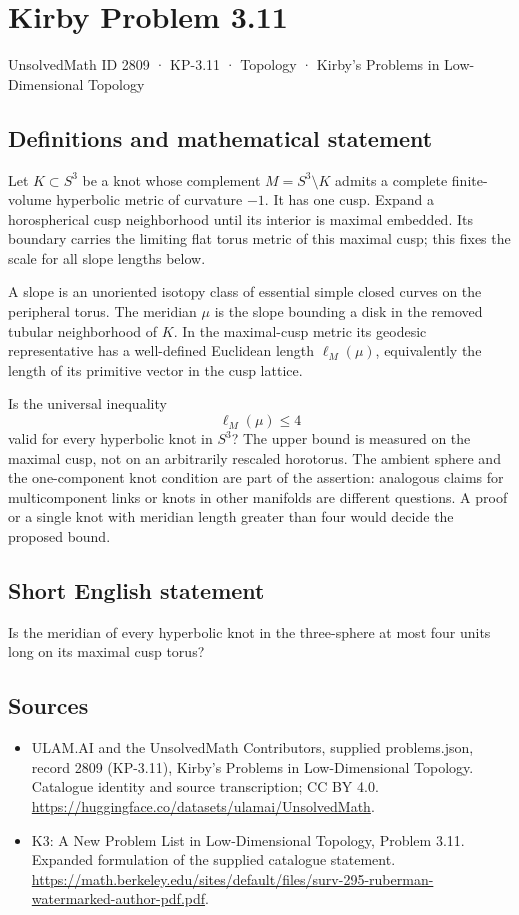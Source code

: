\documentclass[11pt,a4paper]{article}
\begin{document}
\section*{Kirby Problem 3.11}\label{2809}
{\small UnsolvedMath ID 2809 · KP-3.11 · Topology · Kirby's Problems in Low-Dimensional Topology}
\subsection{Definitions and mathematical statement}
Let $K\subset S^3$ be a knot whose complement $M=S^3\setminus K$ admits
a complete finite-volume hyperbolic metric of curvature $-1$. It has one cusp.
Expand a horospherical cusp neighborhood until its interior is maximal embedded.
Its boundary carries the limiting flat torus metric of this maximal cusp;
this fixes the scale for all slope lengths below.

A slope is an unoriented isotopy class of essential simple closed curves on
the peripheral torus. The meridian $\mu$ is the slope bounding a disk in the
removed tubular neighborhood of $K$. In the maximal-cusp metric its geodesic
representative has a well-defined Euclidean length $\ell_M(\mu)$, equivalently
the length of its primitive vector in the cusp lattice.

Is the universal inequality
\[
 \ell_M(\mu)\leq4
\]
valid for every hyperbolic knot in $S^3$? The upper bound is measured on the
maximal cusp, not on an arbitrarily rescaled horotorus. The ambient sphere
and the one-component knot condition are part of the assertion: analogous
claims for multicomponent links or knots in other manifolds are different
questions. A proof or a single knot with meridian length greater than four
would decide the proposed bound.
\subsection{Short English statement}
Is the meridian of every hyperbolic knot in the three-sphere at most four units long on its maximal cusp torus?
\subsection{Sources}
\begin{itemize}
\item[S1] ULAM.AI and the UnsolvedMath Contributors, supplied problems.json, record 2809 (KP-3.11), Kirby's Problems in Low-Dimensional Topology. Catalogue identity and source transcription; CC BY 4.0.
\url{https://huggingface.co/datasets/ulamai/UnsolvedMath}.
\item[S2] K3: A New Problem List in Low-Dimensional Topology, Problem 3.11. Expanded formulation of the supplied catalogue statement.
\url{https://math.berkeley.edu/sites/default/files/surv-295-ruberman-watermarked-author-pdf.pdf}.
\end{itemize}
\end{document}
